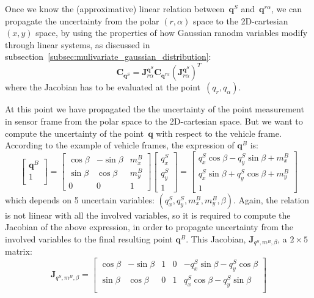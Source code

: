 Once we know the (approximative) linear relation between~$\mathbf{q}^S$ and~$\mathbf{q}^{r\alpha}$, we can propagate the uncertainty from the polar $(r,\alpha)$ space to the 2D-cartesian $(x,y)$ space, by using the properties of how Gaussian ranodm variables modify through linear systems, as discussed in subsection~\ref{subsec:mulivariate_gaussian_distribution}:
\begin{equation}
 \mathbf{C}_{\mathbf{q}^S} = \mathbf{J}^{\mathbf{q}^S}_{r\alpha}\mathbf{C}_{\mathbf{q}^{r\alpha}} (\mathbf{J}^{\mathbf{q}^S}_{r\alpha})^T
\end{equation}
where the Jacobian has to be evaluated at the point~$(q_r,q_{\alpha})$.

At this point we have propagated the the uncertainty of the point measurement in sensor frame from the polar space to the 2D-cartesian space. But we want to compute the uncertainty of the point~$\mathbf{q}$ with respect to the vehicle frame. According to the example of vehicle frames, the expression of $\mathbf{q}^B$ is: 
\begin{equation}
\label{eq:qB_expression}
\left[
\begin{array}{c}
    \mathbf{q}^B\\
    1 \\
 \end{array}
\right] = 
 \left[
 \begin{array}{ccc}
  \cos\beta & -\sin\beta & m^B_x \\
  \sin\beta & \cos\beta & m^B_y \\
  0 & 0 & 1
 \end{array}
 \right]
 \left[
 \begin{array}{c}
  q^S_x \\
  q^S_y \\
  1
 \end{array}
 \right]
 = 
 \left[
 \begin{array}{c}
  q^S_x\cos\beta - q^S_y\sin\beta + m^B_x \\
  q^S_x\sin\beta + q^S_y\cos\beta + m^B_y \\
  1
 \end{array}
 \right]
\end{equation}
which depends on 5 uncertain variables: $(q^S_x, q^S_y, m^B_x, m^B_y, \beta)$. Again, the relation is not liinear with all the involved variables, so it is required to compute the Jacobian of the above expression, in  order to propagate uncertainty from the involved variables to the final resulting point $\mathbf{q}^B$. This Jacobian, $\mathbf{J}_{q^S,m^B,\beta}$, a $2\times 5$ matrix:
\begin{equation}
 \mathbf{J}_{q^S,m^B,\beta} = 
 \left[
 \begin{array}{ccccc}
 \cos \beta & -\sin \beta & 1 & 0 & -q^S_x\sin\beta - q^S_y\cos\beta  \\
 \sin \beta & \cos \beta & 0 & 1 &  q^S_x\cos\beta - q^S_y\sin\beta \\
 \end{array}
 \right]
 \end{equation}

